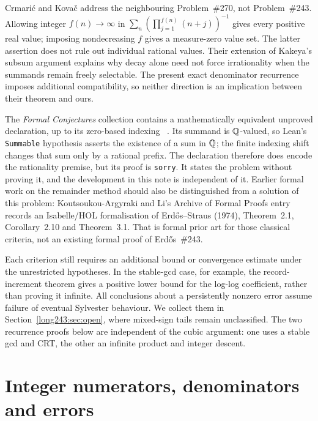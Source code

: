 \documentclass[11pt]{article}
\begin{document}
Crmari\'{c} and Kova\v{c} \cite[Theorems~1--2]{crmarickovac2025}
address the neighbouring Problem~\#270, not Problem~\#243. Allowing integer
$f(n)\to\infty$ in $\sum_n(\prod_{j=1}^{f(n)}(n+j))^{-1}$ gives every
positive real value; imposing nondecreasing $f$ gives a measure-zero value
set. The latter assertion does not rule out individual rational values.
Their extension of Kakeya's subsum argument explains why decay alone need
not force irrationality when the summands remain freely selectable. The
present exact denominator recurrence imposes additional compatibility, so
neither direction is an implication between their theorem and ours.

The \emph{Formal Conjectures} collection contains a mathematically equivalent
unproved declaration, up to its zero-based indexing
~\cite{formalconjectures243}.  Its summand is $\mathbb{Q}$-valued, so Lean's
\texttt{Summable} hypothesis asserts the existence of a sum in $\mathbb{Q}$; the
finite indexing shift changes that sum only by a rational prefix.  The
declaration therefore does encode the rationality premise, but its proof is
\texttt{sorry}.  It states the problem without proving it, and the
development in this note is independent of it. Earlier formal work on the remainder method should also be
distinguished from a solution of this problem: Koutsoukou-Argyraki and Li's
Archive of Formal Proofs entry \cite{kouli2020} records an Isabelle/HOL
formalisation of Erd\H{o}s--Straus (1974), Theorem~2.1, Corollary~2.10 and
Theorem~3.1. That is formal prior art for those classical criteria, not an
existing formal proof of Erd\H{o}s~\#243.

Each criterion still requires an additional bound or convergence
estimate under the unrestricted hypotheses. In the stable-gcd case,
for example, the record-increment theorem gives a positive lower bound
for the log-log coefficient, rather than proving it infinite.
All conclusions about a persistently nonzero error assume failure of
eventual Sylvester behaviour. We collect them in
Section~\ref{long243:sec:open}, where mixed-sign tails remain
unclassified. The two recurrence proofs below are independent of the
cubic argument: one uses a stable gcd and CRT, the other an infinite
product and integer descent.

\section{Integer numerators, denominators and errors}\label{long243:sec:state}
\end{document}
